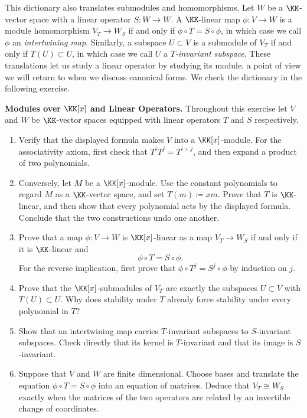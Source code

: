 \documentclass[12pt,reqno]{amsart}
\begin{document}
This dictionary also translates submodules and homomorphisms. Let $W$ be a $\KK$-vector space with a linear operator $S:W\to W$. A $\KK$-linear map $\phi:V\to W$ is a module homomorphism $V_T\to W_S$ if and only if $\phi\circ T=S\circ\phi$, in which case we call $\phi$ an \emph{intertwining map}. Similarly, a subspace $U\subset V$ is a submodule of $V_T$ if and only if $T(U)\subset U$, in which case we call $U$ a \emph{$T$-invariant subspace}. These translations let us study a linear operator by studying its module, a point of view we will return to when we discuss canonical forms. We check the dictionary in the following exercise.

\hrulefill

\begin{problems}
\item\label{m:dictionary} \textbf{Modules over $\KK[x]$ and Linear Operators.} Throughout this exercise let $V$ and $W$ be $\KK$-vector spaces equipped with linear operators $T$ and $S$ respectively.
\begin{enumerate}
\item Verify that the displayed formula makes $V$ into a $\KK[x]$-module. For the associativity axiom, first check that $T^iT^j=T^{i+j}$, and then expand a product of two polynomials.
\item Conversely, let $M$ be a $\KK[x]$-module. Use the constant polynomials to regard $M$ as a $\KK$-vector space, and set $T(m)\coloneqq xm$. Prove that $T$ is $\KK$-linear, and then show that every polynomial acts by the displayed formula. Conclude that the two constructions undo one another.
\item Prove that a map $\phi:V\to W$ is $\KK[x]$-linear as a map $V_T\to W_S$ if and only if it is $\KK$-linear and
\[
 \phi\circ T=S\circ \phi.
\]
For the reverse implication, first prove that $\phi\circ T^j=S^j\circ\phi$ by induction on $j$.
\item Prove that the $\KK[x]$-submodules of $V_T$ are exactly the subspaces $U\subset V$ with $T(U)\subset U$. Why does stability under $T$ already force stability under every polynomial in $T$?
\item Show that an intertwining map carries $T$-invariant subspaces to $S$-invariant subspaces. Check directly that its kernel is $T$-invariant and that its image is $S$-invariant.
\item Suppose that $V$ and $W$ are finite dimensional. Choose bases and translate the equation $\phi\circ T=S\circ\phi$ into an equation of matrices. Deduce that $V_T\cong W_S$ exactly when the matrices of the two operators are related by an invertible change of coordinates.
\end{enumerate}
\end{problems}
\end{document}
